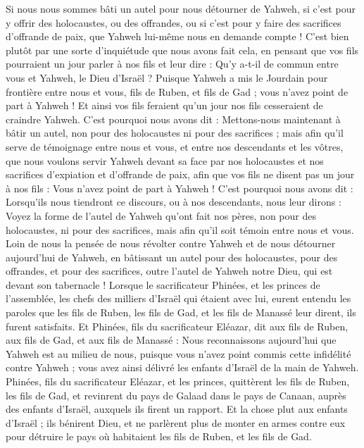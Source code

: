 \begin{multicols}{2}
Si nous nous sommes bâti un autel pour nous détourner de Yahweh, si c’est pour y offrir des holocaustes, ou des offrandes, ou si c’est pour y faire des sacrifices d’offrande de paix, que Yahweh lui-même nous en demande compte !
C’est bien plutôt par une sorte d’inquiétude que nous avons fait cela, en pensant que vos fils pourraient un jour parler à nos fils et leur dire : Qu’y a-t-il de commun entre vous et Yahweh, le Dieu d’Israël ?
Puisque Yahweh a mis le Jourdain pour frontière entre nous et vous, fils de Ruben, et fils de Gad ; vous n’avez point de part à Yahweh ! Et ainsi vos fils feraient qu’un jour nos fils cesseraient de craindre Yahweh.
C’est pourquoi nous avons dit : Mettons-nous maintenant à bâtir un autel, non pour des holocaustes ni pour des sacrifices ;
mais afin qu’il serve de témoignage entre nous et vous, et entre nos descendants et les vôtres, que nous voulons servir Yahweh devant sa face par nos holocaustes et nos sacrifices d’expiation et d’offrande de paix, afin que vos fils ne disent pas un jour à nos fils : Vous n’avez point de part à Yahweh !
C’est pourquoi nous avons dit : Lorsqu’ils nous tiendront ce discours, ou à nos descendants, nous leur dirons : Voyez la forme de l’autel de Yahweh qu’ont fait nos pères, non pour des holocaustes, ni pour des sacrifices, mais afin qu’il soit témoin entre nous et vous.
Loin de nous la pensée de nous révolter contre Yahweh et de nous détourner aujourd’hui de Yahweh, en bâtissant un autel pour des holocaustes, pour des offrandes, et pour des sacrifices, outre l’autel de Yahweh notre Dieu, qui est devant son tabernacle !
Lorsque le sacrificateur Phinées, et les princes de l’assemblée, les chefs des milliers d’Israël qui étaient avec lui, eurent entendu les paroles que les fils de Ruben, les fils de Gad, et les fils de Manassé leur dirent, ils furent satisfaits.
Et Phinées, fils du sacrificateur Eléazar, dit aux fils de Ruben, aux fils de Gad, et aux fils de Manassé : Nous reconnaissons aujourd’hui que Yahweh est au milieu de nous, puisque vous n’avez point commis cette infidélité contre Yahweh ; vous avez ainsi délivré les enfants d’Israël de la main de Yahweh.
Phinées, fils du sacrificateur Eléazar, et les princes, quittèrent les fils de Ruben, les fils de Gad, et revinrent du pays de Galaad dans le pays de Canaan, auprès des enfants d’Israël, auxquels ils firent un rapport.
Et la chose plut aux enfants d’Israël ; ils bénirent Dieu, et ne parlèrent plus de monter en armes contre eux pour détruire le pays où habitaient les fils de Ruben, et les fils de Gad.

\end{multicols}
